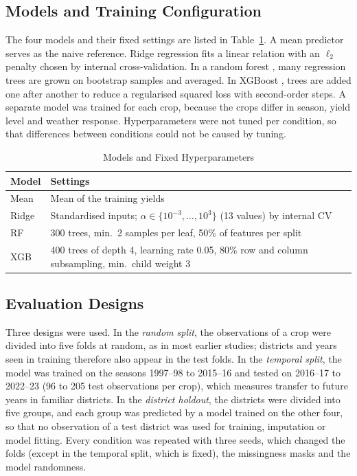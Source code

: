 \subsection{Models and Training Configuration}

The four models and their fixed settings are listed in Table~\ref{tab:models}. A mean predictor
serves as the naive reference. Ridge regression \cite{hoerl1970} fits a linear relation with an
$\ell_2$ penalty chosen by internal cross-validation. In a random forest \cite{breiman2001}, many
regression trees are grown on bootstrap samples and averaged. In XGBoost \cite{chen2016}, trees are
added one after another to reduce a regularised squared loss with second-order steps. A separate
model was trained for each crop, because the crops differ in season, yield level and weather
response. Hyperparameters were not tuned per condition, so that differences between conditions
could not be caused by tuning.

\begin{table}[!t]
\caption{Models and Fixed Hyperparameters}\label{tab:models}
\centering\footnotesize
\begin{tabular}{lp{5.6cm}}
\toprule
Model & Settings \\
\midrule
Mean & Mean of the training yields \\
Ridge & Standardised inputs; $\alpha \in \{10^{-3}, \ldots, 10^{3}\}$ (13 values) by internal CV \\
RF & 300 trees, min.\ 2 samples per leaf, 50\% of features per split \\
XGB & 400 trees of depth 4, learning rate 0.05, 80\% row and column subsampling, min.\ child weight 3 \\
\bottomrule
\end{tabular}
\end{table}

\subsection{Evaluation Designs}

Three designs were used. In the \emph{random split}, the observations of a crop were divided into
five folds at random, as in most earlier studies; districts and years seen in training therefore
also appear in the test folds. In the \emph{temporal split}, the model was trained on the seasons
1997--98 to 2015--16 and tested on 2016--17 to 2022--23 (96 to 205 test observations per crop),
which measures transfer to future years in familiar districts. In the \emph{district holdout},
the districts were divided into five groups, and each group was predicted by a model trained on the
other four, so that no observation of a test district was used for training, imputation or model
fitting. Every condition was repeated with three seeds, which changed the folds (except in the
temporal split, which is fixed), the missingness masks and the model randomness.

